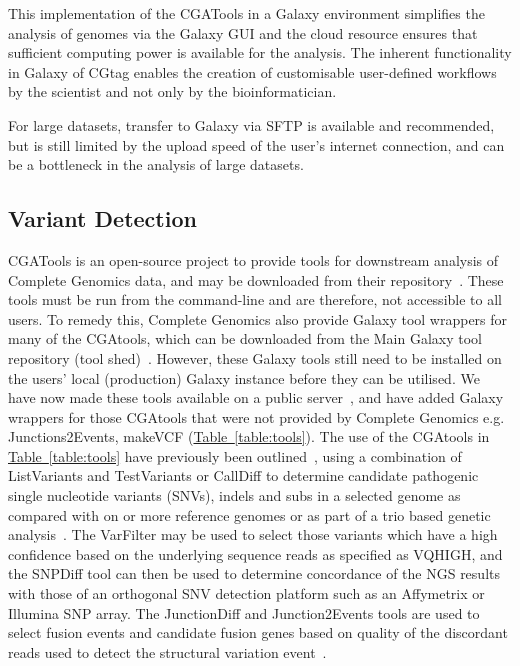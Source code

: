 This implementation of the CGATools in a Galaxy environment simplifies the analysis of genomes via the Galaxy GUI and the cloud resource ensures that sufficient computing power is available for the analysis. The inherent functionality in Galaxy of CGtag enables the creation of customisable user-defined workflows by the scientist and not only by the bioinformatician.

For large datasets, transfer to Galaxy via SFTP is available and recommended, but is still limited by the upload speed of the user’s internet connection, and can be a bottleneck in the analysis of large datasets.


\subsection*{Variant Detection}

CGATools is an open-source project to provide tools for downstream analysis of Complete Genomics data, and may be downloaded from their repository~\cite{url-cgatools}. These tools must be run from the command-line and are therefore, not accessible to all users. To remedy this, Complete Genomics also provide Galaxy tool wrappers for many of the CGAtools, which can be downloaded from the Main Galaxy tool repository (tool shed)~\cite{url-toolshed}. However, these Galaxy tools still need to be installed on the users’ local (production) Galaxy instance before they can be utilised. We have now made these tools available on a public server~\cite{url-nbicgalaxy}, and have added Galaxy wrappers for those CGAtools that were not provided by Complete Genomics e.g. Junctions2Events, makeVCF (\hyperref[table:tools]{Table~\ref{table:tools}}). The use of the CGAtools in \hyperref[table:tools]{Table~\ref{table:tools}} have previously been outlined~\cite{nieminen}, using a combination of ListVariants and TestVariants or CallDiff to determine candidate pathogenic single nucleotide variants (SNVs), indels and subs in a selected genome as compared with on or more reference genomes or as part of a trio based genetic analysis~\cite{nieminen}. The VarFilter may be used to select those variants which have a high confidence based on the underlying sequence reads as specified as VQHIGH, and the SNPDiff tool can then be used to determine concordance of the NGS results with those of an orthogonal SNV detection platform such as an Affymetrix or Illumina SNP array. The JunctionDiff and Junction2Events tools are used to select fusion events and candidate fusion genes based on quality of the discordant reads used to detect the structural variation event~\cite{ifuse}.


